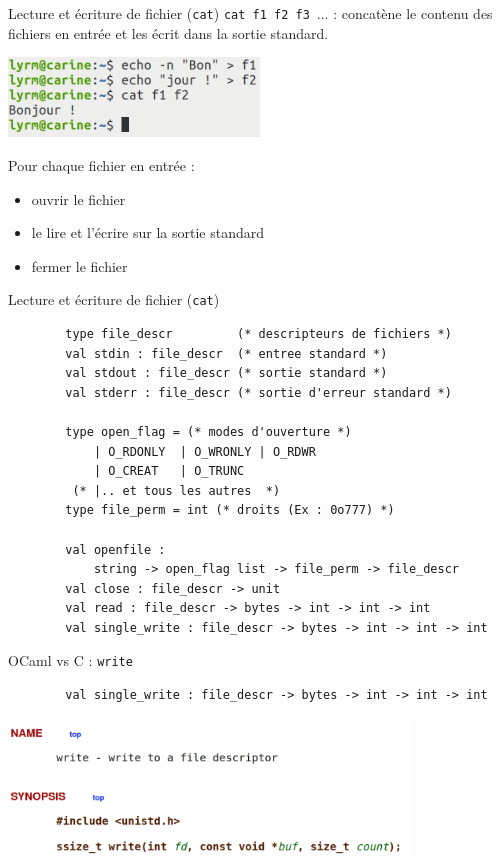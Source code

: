 \begin{frame}[fragile]{Lecture et écriture de fichier (\texttt{cat})}
    \texttt{cat f1 f2 f3}~... : concatène le contenu des fichiers en entrée et les écrit dans la sortie standard.
    \pause
    
    
    \includegraphics[width=0.5\textwidth]{slides/images/shell_cat.png}
    
    \pause{}

    Pour chaque fichier en entrée : 
    \begin{itemize}[label=\small{}]
        \item ouvrir le fichier
        \item le lire et l'écrire sur la sortie standard
        \item fermer le fichier
    \end{itemize}
\end{frame}

\begin{frame}[fragile]{Lecture et écriture de fichier (\texttt{cat})}
    \begin{lstlisting}
        type file_descr         (* descripteurs de fichiers *)
        val stdin : file_descr  (* entree standard *)
        val stdout : file_descr (* sortie standard *)
        val stderr : file_descr (* sortie d'erreur standard *)
        
        type open_flag = (* modes d'ouverture *)
            | O_RDONLY  | O_WRONLY | O_RDWR
            | O_CREAT   | O_TRUNC 
         (* |.. et tous les autres  *)
        type file_perm = int (* droits (Ex : 0o777) *)
        
        val openfile : 
            string -> open_flag list -> file_perm -> file_descr
        val close : file_descr -> unit
        val read : file_descr -> bytes -> int -> int -> int
        val single_write : file_descr -> bytes -> int -> int -> int
    \end{lstlisting}
\end{frame}

\begin{frame}[fragile]{OCaml vs C : \texttt{write}}
    \begin{lstlisting}
        val single_write : file_descr -> bytes -> int -> int -> int    
    \end{lstlisting}
    
    \includegraphics[width=0.8\textwidth]{slides/images/c_api_write.png}
\end{frame}


